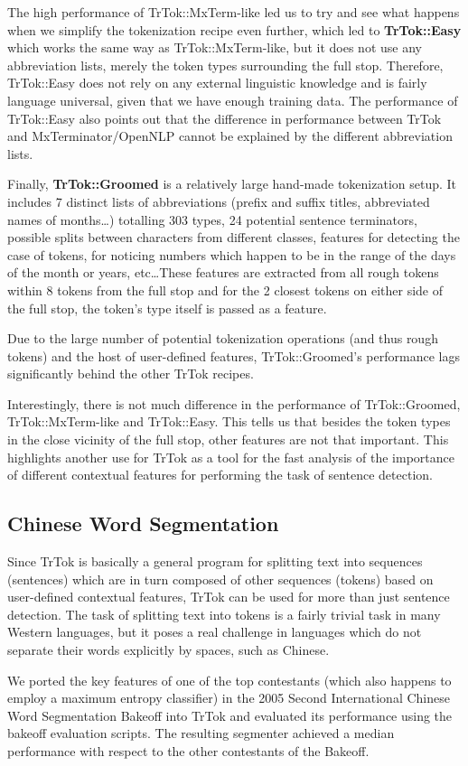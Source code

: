 The high performance of TrTok::MxTerm-like led us to try and see what
happens when we simplify the tokenization recipe even further, which
led to \textbf{TrTok::Easy} which works the same way as
TrTok::MxTerm-like, but it does not use any abbreviation lists, merely
the token types surrounding the full stop. Therefore, TrTok::Easy does
not rely on any external linguistic knowledge and is fairly language
universal, given that we have enough training data. The performance of
TrTok::Easy also points out that the difference in performance between
TrTok and MxTerminator/OpenNLP cannot be explained by the different
abbreviation lists.

Finally, \textbf{TrTok::Groomed} is a relatively large hand-made
tokenization setup. It includes 7 distinct lists of abbreviations
(prefix and suffix titles, abbreviated names of months\ldots)
totalling 303 types, 24 potential sentence terminators, possible
splits between characters from different classes, features for
detecting the case of tokens, for noticing numbers which happen to be
in the range of the days of the month or years, etc\ldots These
features are extracted from all rough tokens within 8 tokens from the
full stop and for the 2 closest tokens on either side of the full
stop, the token's type itself is passed as a feature.

Due to the large number of potential tokenization operations (and thus
rough tokens) and the host of user-defined features, TrTok::Groomed's
performance lags significantly behind the other TrTok recipes.

Interestingly, there is not much difference in the performance of
TrTok::Groomed, TrTok::MxTerm-like and TrTok::Easy. This tells us that
besides the token types in the close vicinity of the full stop, other
features are not that important. This highlights another use for TrTok
as a tool for the fast analysis of the importance of different
contextual features for performing the task of sentence detection.

\subsection{Chinese Word Segmentation}

Since TrTok is basically a general program for splitting text into
sequences (sentences) which are in turn composed of other sequences
(tokens) based on user-defined contextual features, TrTok can be used
for more than just sentence detection. The task of splitting text into
tokens is a fairly trivial task in many Western languages, but it
poses a real challenge in languages which do not separate their words
explicitly by spaces, such as Chinese.

We ported the key features of one of the top contestants (which also
happens to employ a maximum entropy classifier)
\cite{seg-chinese-maxent} in the 2005 Second International Chinese
Word Segmentation Bakeoff into TrTok and evaluated its performance
using the bakeoff evaluation scripts. The resulting segmenter achieved
a median performance with respect to the other contestants of the
Bakeoff.

